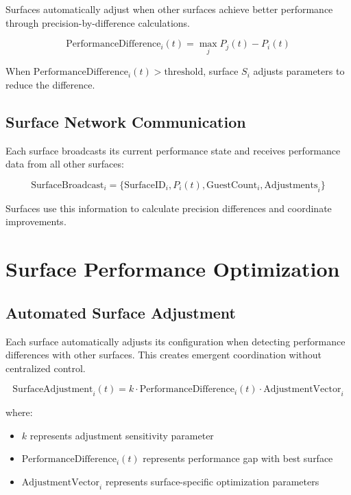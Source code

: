 \documentclass[12pt,a4paper]{article}
\begin{document}
Surfaces automatically adjust when other surfaces achieve better performance through precision-by-difference calculations.

\begin{equation}
\text{PerformanceDifference}_i(t) = \max_j P_j(t) - P_i(t)
\end{equation}

When $\text{PerformanceDifference}_i(t) > \text{threshold}$, surface $S_i$ adjusts parameters to reduce the difference.

\subsection{Surface Network Communication}

Each surface broadcasts its current performance state and receives performance data from all other surfaces:

\begin{equation}
\text{SurfaceBroadcast}_i = \{\text{SurfaceID}_i, P_i(t), \text{GuestCount}_i, \text{Adjustments}_i\}
\end{equation}

Surfaces use this information to calculate precision differences and coordinate improvements.

\section{Surface Performance Optimization}

\subsection{Automated Surface Adjustment}

Each surface automatically adjusts its configuration when detecting performance differences with other surfaces. This creates emergent coordination without centralized control.

\begin{equation}
\text{SurfaceAdjustment}_i(t) = k \cdot \text{PerformanceDifference}_i(t) \cdot \text{AdjustmentVector}_i
\end{equation}

where:
\begin{itemize}
\item $k$ represents adjustment sensitivity parameter
\item $\text{PerformanceDifference}_i(t)$ represents performance gap with best surface
\item $\text{AdjustmentVector}_i$ represents surface-specific optimization parameters
\end{itemize}
\end{document}
